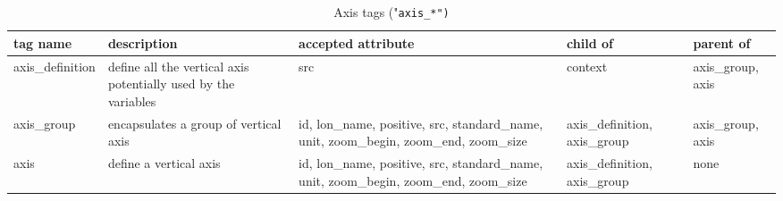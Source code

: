 \documentclass[../tex_main/NEMO_manual]{subfiles}
\begin{document}
\begin{table} \scriptsize
	\begin{tabularx}{\textwidth}{|l|X|X|X|X|} \hline
	tag name                                                                               & 
	description                                                                            & 
	accepted attribute                                                                     & 
	child of                                                                               & 
	parent of         \\ \hline \hline
	axis\_definition                                                                       & 
	define all the vertical axis potentially used by the variables                         & 
	src                                                                                    & 
	context                                                                                & 
	axis\_group, axis \\ \hline
	axis\_group                                                                            & 
	encapsulates a group of vertical axis                                                  & 
	id, lon\_name, positive, src, standard\_name, unit, zoom\_begin, zoom\_end, zoom\_size & 
	axis\_definition, axis\_group                                                          & 
	axis\_group, axis \\ \hline
	axis                                                                                   & 
	define a vertical axis                                                                 & 
	id, lon\_name, positive, src, standard\_name, unit, zoom\_begin, zoom\_end, zoom\_size & 
	axis\_definition, axis\_group                                                          & 
	none					\\ \hline
	\end{tabularx}
	\caption{Axis tags ("\tt{axis\_*}")}
\end{table}
\end{document}
